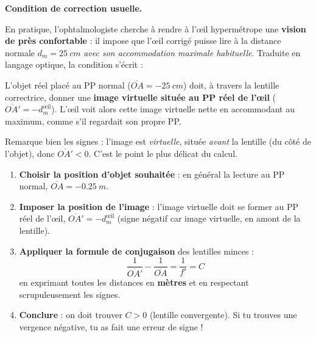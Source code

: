 \documentclass[11pt]{article}
\newcounter{popsec}
\newcounter{popsub}
\newcommand{\courssub}[1]{%
  \stepcounter{popsub}%
  \par\vspace{9pt}\noindent{\popxbold\fontsize{11.5}{13}\selectfont\color{popink}{\color{poporange}\thepopsec.\thepopsub}\hspace{6pt}#1}\par\nopagebreak\vspace{4pt}
}
\begin{document}
\textbf{Condition de correction usuelle.}\par

En pratique, l'ophtalmologiste cherche à rendre à l'œil hypermétrope une \textbf{vision de près confortable} : il impose que l'œil corrigé puisse lire à la distance normale $d_m = \SI{25}{cm}$ \emph{avec son accommodation maximale habituelle}. Traduite en langage optique, la condition s'écrit :

\begin{aretenir}
L'objet réel placé au PP normal ($\overline{OA} = -\SI{25}{cm}$) doit, à travers la lentille correctrice, donner une \textbf{image virtuelle située au PP réel de l'œil} ($\overline{OA'} = -d_m^{\text{œil}}$). L'œil voit alors cette image virtuelle nette en accommodant au maximum, comme s'il regardait son propre PP.
\end{aretenir}

Remarque bien les signes : l'image est \emph{virtuelle}, située \emph{avant} la lentille (du côté de l'objet), donc $\overline{OA'} < 0$. C'est le point le plus délicat du calcul.

\begin{methode}
\begin{enumerate}
\item \textbf{Choisir la position d'objet souhaitée} : en général la lecture au PP normal, $\overline{OA} = -\SI{0,25}{m}$.
\item \textbf{Imposer la position de l'image} : l'image virtuelle doit se former au PP réel de l'œil, $\overline{OA'} = -d_m^{\text{œil}}$ (signe négatif car image virtuelle, en amont de la lentille).
\item \textbf{Appliquer la formule de conjugaison} des lentilles minces :
\[ \frac{1}{\overline{OA'}} - \frac{1}{\overline{OA}} = \frac{1}{f'} = C \]
en exprimant toutes les distances en \textbf{mètres} et en respectant scrupuleusement les signes.
\item \textbf{Conclure} : on doit trouver $C > 0$ (lentille convergente). Si tu trouves une vergence négative, tu as fait une erreur de signe !
\end{enumerate}
\end{methode}

\courssub{Exemple chiffré complet}
\end{document}

